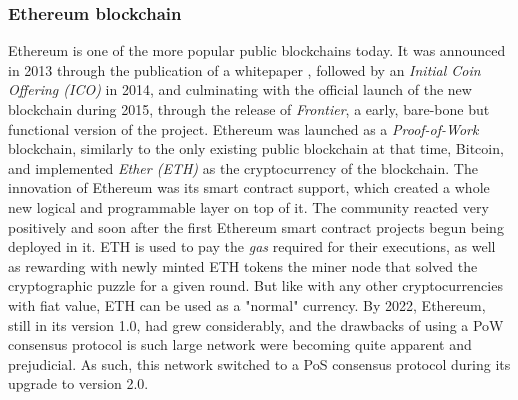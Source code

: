 \documentclass[../main.tex]{subfiles}
\begin{document}
\subsubsection{Ethereum blockchain}
Ethereum is one of the more popular public blockchains today. It was announced in 2013 through the publication of a whitepaper \cite{Buterin2014}, followed by an \textit{Initial Coin Offering (ICO)} in 2014, and culminating with the official launch of the new blockchain during 2015, through the release of \textit{Frontier}, a early, bare-bone but functional version of the project. Ethereum was launched as a \textit{Proof-of-Work} blockchain, similarly to the only existing public blockchain at that time, Bitcoin, and implemented \textit{Ether (ETH)} as the cryptocurrency of the blockchain. The innovation of Ethereum was its smart contract support, which created a whole new logical and programmable layer on top of it. The community reacted very positively and soon after the first Ethereum smart contract projects begun being deployed in it. ETH is used to pay the \textit{gas} required for their executions, as well as rewarding with newly minted ETH tokens the miner node that solved the cryptographic puzzle for a given round. But like with any other cryptocurrencies with fiat value, ETH can be used as a "normal" currency. By 2022, Ethereum, still in its version 1.0, had grew considerably, and the drawbacks of using a PoW consensus protocol is such large network were becoming quite apparent and prejudicial. As such, this network switched to a PoS consensus protocol during its upgrade to version 2.0.
\par
\end{document}
